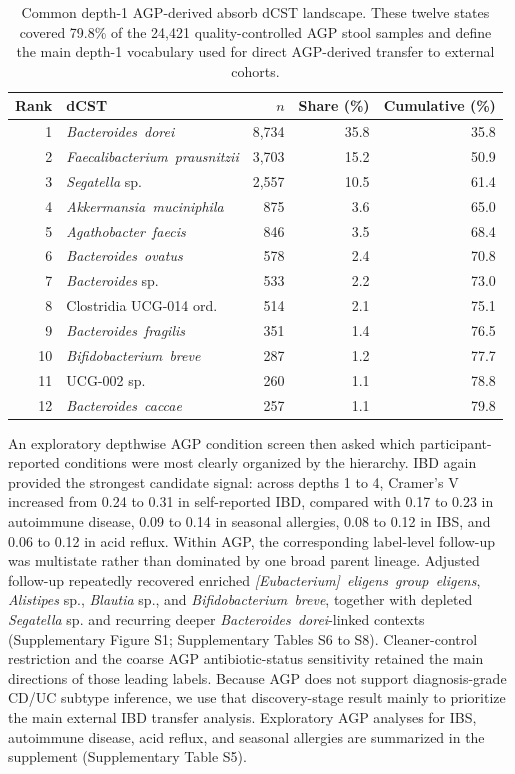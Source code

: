 \documentclass[
  11pt,
]{article}
\newcommand{\taxon}[1]{\emph{#1}}
\begin{document}
\begin{table}[H]
\centering
\caption{Common depth-1 AGP-derived absorb dCST landscape. These twelve
states covered 79.8\% of the 24,421 quality-controlled AGP stool
samples and define the main depth-1 vocabulary used for direct
AGP-derived transfer to external cohorts.}
\label{tab:agp-depth1-landscape}
\footnotesize
\renewcommand{\arraystretch}{1.04}
\begin{tabular}{@{} r l r r r @{}}
\toprule
Rank & dCST & $n$ & Share (\%) & Cumulative (\%) \\
\midrule
1 & \taxon{Bacteroides~dorei} & 8,734 & 35.8 & 35.8 \\
2 & \taxon{Faecalibacterium~prausnitzii} & 3,703 & 15.2 & 50.9 \\
3 & \taxon{Segatella} sp. & 2,557 & 10.5 & 61.4 \\
4 & \taxon{Akkermansia~muciniphila} & 875 & 3.6 & 65.0 \\
5 & \taxon{Agathobacter~faecis} & 846 & 3.5 & 68.4 \\
6 & \taxon{Bacteroides~ovatus} & 578 & 2.4 & 70.8 \\
7 & \taxon{Bacteroides} sp. & 533 & 2.2 & 73.0 \\
8 & Clostridia UCG-014 ord. & 514 & 2.1 & 75.1 \\
9 & \taxon{Bacteroides~fragilis} & 351 & 1.4 & 76.5 \\
10 & \taxon{Bifidobacterium~breve} & 287 & 1.2 & 77.7 \\
11 & UCG-002 sp. & 260 & 1.1 & 78.8 \\
12 & \taxon{Bacteroides~caccae} & 257 & 1.1 & 79.8 \\
\bottomrule
\end{tabular}
\end{table}

An exploratory depthwise AGP condition screen then asked which
participant-reported conditions were most clearly organized by the
hierarchy.
IBD again provided the strongest candidate signal: across depths 1 to
4, Cramer's V increased from 0.24 to 0.31 in self-reported IBD,
compared with 0.17 to 0.23 in autoimmune disease, 0.09 to 0.14 in
seasonal allergies, 0.08 to 0.12 in IBS, and 0.06 to 0.12 in acid
reflux. Within AGP, the corresponding label-level follow-up was
multistate rather than dominated by one broad parent lineage. Adjusted
follow-up repeatedly recovered enriched
\taxon{[Eubacterium]~eligens~group~eligens},
\taxon{Alistipes} sp., \taxon{Blautia} sp., and
\taxon{Bifidobacterium~breve}, together with depleted
\taxon{Segatella} sp. and recurring deeper
\taxon{Bacteroides~dorei}-linked contexts (Supplementary Figure S1;
Supplementary Tables S6 to S8). Cleaner-control restriction and the
coarse AGP antibiotic-status sensitivity retained the main directions of
those leading labels. Because AGP does not support diagnosis-grade CD/UC
subtype inference, we use that discovery-stage result mainly to
prioritize the main external IBD transfer analysis. Exploratory AGP
analyses for IBS, autoimmune disease, acid reflux, and seasonal
allergies are summarized in the supplement (Supplementary Table S5).
\end{document}
